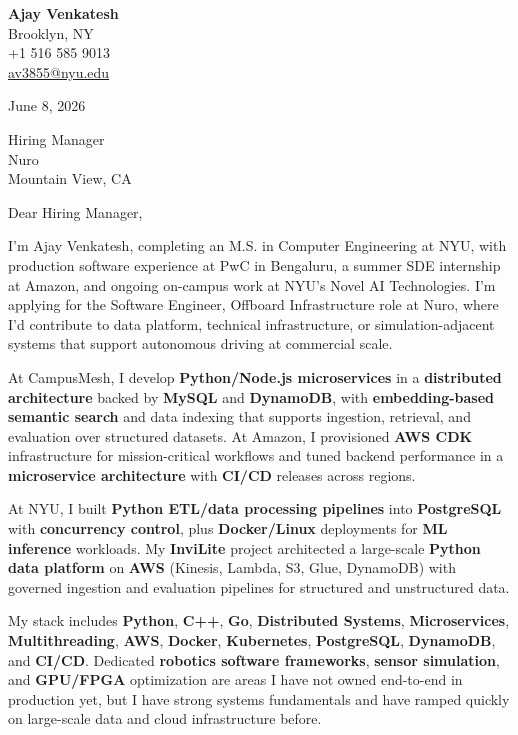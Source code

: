 \documentclass[letterpaper,11pt]{article}
\begin{document}
\begin{flushleft}
\textbf{\large Ajay Venkatesh} \\
Brooklyn, NY \\
+1 516 585 9013 \\
\href{mailto:av3855@nyu.edu}{av3855@nyu.edu}
\end{flushleft}
\vspace{10pt}
June 8, 2026
\vspace{6pt}

Hiring Manager \\
Nuro \\
Mountain View, CA

\vspace{10pt}

Dear Hiring Manager,

I'm Ajay Venkatesh, completing an M.S. in Computer Engineering at NYU, with production software experience at PwC in Bengaluru, a summer SDE internship at Amazon, and ongoing on-campus work at NYU's Novel AI Technologies. I'm applying for the Software Engineer, Offboard Infrastructure role at Nuro, where I'd contribute to data platform, technical infrastructure, or simulation-adjacent systems that support autonomous driving at commercial scale.

At CampusMesh, I develop \textbf{Python/Node.js microservices} in a \textbf{distributed architecture} backed by \textbf{MySQL} and \textbf{DynamoDB}, with \textbf{embedding-based semantic search} and data indexing that supports ingestion, retrieval, and evaluation over structured datasets. At Amazon, I provisioned \textbf{AWS CDK} infrastructure for mission-critical workflows and tuned backend performance in a \textbf{microservice architecture} with \textbf{CI/CD} releases across regions.

At NYU, I built \textbf{Python ETL/data processing pipelines} into \textbf{PostgreSQL} with \textbf{concurrency control}, plus \textbf{Docker/Linux} deployments for \textbf{ML inference} workloads. My \textbf{InviLite} project architected a large-scale \textbf{Python data platform} on \textbf{AWS} (Kinesis, Lambda, S3, Glue, DynamoDB) with governed ingestion and evaluation pipelines for structured and unstructured data.

My stack includes \textbf{Python}, \textbf{C++}, \textbf{Go}, \textbf{Distributed Systems}, \textbf{Microservices}, \textbf{Multithreading}, \textbf{AWS}, \textbf{Docker}, \textbf{Kubernetes}, \textbf{PostgreSQL}, \textbf{DynamoDB}, and \textbf{CI/CD}. Dedicated \textbf{robotics software frameworks}, \textbf{sensor simulation}, and \textbf{GPU/FPGA} optimization are areas I have not owned end-to-end in production yet, but I have strong systems fundamentals and have ramped quickly on large-scale data and cloud infrastructure before.
\end{document}
